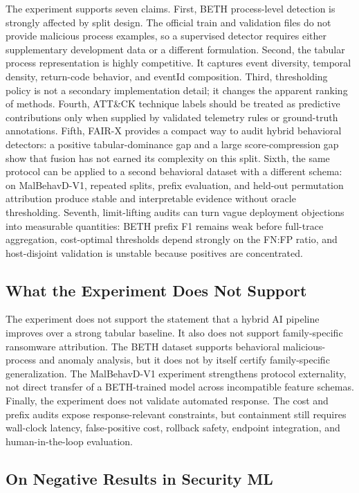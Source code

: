 \documentclass[10pt,journal,compsoc]{IEEEtran}
\begin{document}
The experiment supports seven claims. First, BETH process-level detection is strongly affected by split design. The official train and validation files do not provide malicious process examples, so a supervised detector requires either supplementary development data or a different formulation. Second, the tabular process representation is highly competitive. It captures event diversity, temporal density, return-code behavior, and eventId composition. Third, thresholding policy is not a secondary implementation detail; it changes the apparent ranking of methods. Fourth, ATT\&CK technique labels should be treated as predictive contributions only when supplied by validated telemetry rules or ground-truth annotations. Fifth, FAIR-X provides a compact way to audit hybrid behavioral detectors: a positive tabular-dominance gap and a large score-compression gap show that fusion has not earned its complexity on this split. Sixth, the same protocol can be applied to a second behavioral dataset with a different schema: on MalBehavD-V1, repeated splits, prefix evaluation, and held-out permutation attribution produce stable and interpretable evidence without oracle thresholding. Seventh, limit-lifting audits can turn vague deployment objections into measurable quantities: BETH prefix F1 remains weak before full-trace aggregation, cost-optimal thresholds depend strongly on the FN:FP ratio, and host-disjoint validation is unstable because positives are concentrated.

\subsection{What the Experiment Does Not Support}

The experiment does not support the statement that a hybrid AI pipeline improves over a strong tabular baseline. It also does not support family-specific ransomware attribution. The BETH dataset supports behavioral malicious-process and anomaly analysis, but it does not by itself certify family-specific generalization. The MalBehavD-V1 experiment strengthens protocol externality, not direct transfer of a BETH-trained model across incompatible feature schemas. Finally, the experiment does not validate automated response. The cost and prefix audits expose response-relevant constraints, but containment still requires wall-clock latency, false-positive cost, rollback safety, endpoint integration, and human-in-the-loop evaluation.

\subsection{On Negative Results in Security ML}
\end{document}
